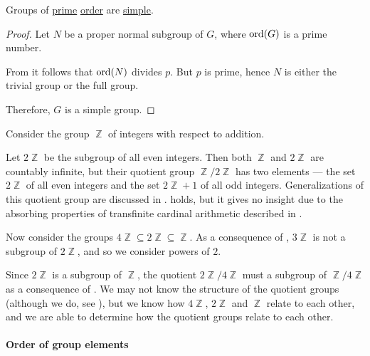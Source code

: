 \begin{corollary}\label{thm:prime_groups_are_simple}
  Groups of \hyperref[def:prime_number]{prime} \hyperref[def:group_order]{order} are \hyperref[def:simple_object]{simple}.
\end{corollary}
\begin{proof}
  Let \( N \) be a proper normal subgroup of \( G \), where \( \operatorname{ord}(G) \) is a prime number.

  From  it follows that \( \operatorname{ord}(N) \) divides \( p \). But \( p \) is prime, hence \( N \) is either the trivial group or the full group.

  Therefore, \( G \) is a simple group.
\end{proof}

\begin{example}\label{ex:subgroups_of_integers}
  Consider the group \( \BbbZ \) of integers with respect to addition.

  Let \( 2\BbbZ \) be the subgroup of all even integers. Then both \( \BbbZ \) and \( 2\BbbZ \) are countably infinite, but their quotient group \( \BbbZ / 2\BbbZ \) has two elements --- the set \( 2\BbbZ \) of all even integers and the set \( 2\BbbZ + 1 \) of all odd integers. Generalizations of this quotient group are discussed in .  holds, but it gives no insight due to the absorbing properties of transfinite cardinal arithmetic described in .

  Now consider the groups \( 4\BbbZ \subseteq 2\BbbZ \subseteq \BbbZ \). As a consequence of , \( 3\BbbZ \) is not a subgroup of \( 2\BbbZ \), and so we consider powers of \( 2 \).

  Since \( 2\BbbZ \) is a subgroup of \( \BbbZ \), the quotient \( 2\BbbZ / 4\BbbZ \) must a subgroup of \( \BbbZ / 4\BbbZ \) as a consequence of . We may not know the structure of the quotient groups (although we do, see ), but we know how \( 4\BbbZ \), \( 2\BbbZ \) and \( \BbbZ \) relate to each other, and we are able to determine how the quotient groups relate to each other.
\end{example}

\paragraph{Order of group elements}

